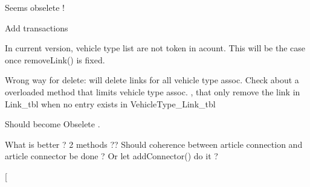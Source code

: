 \begin{DoxyRefList}
\item[\label{todo__todo000093}%
\hypertarget{todo__todo000093}{}%
Class \hyperlink{classmdt_basic_state_machine}{mdt\-Basic\-State\-Machine$<$ S $>$} ]Seems obselete !  
\item[\label{todo__todo000054}%
\hypertarget{todo__todo000054}{}%
Member \hyperlink{classmdt_cl_direct_link_aa7a155c3bf99b91e2d9cff85e93f332b}{mdt\-Cl\-Direct\-Link\-:\-:add\-Links\-By\-Unit\-Connector} (const Q\-Variant unit\-Connector\-Id\-S, const Q\-Variant unit\-Connector\-Id\-E, \hyperlink{classmdt_cl_path_graph}{mdt\-Cl\-Path\-Graph} $\ast$graph)]Add transactions  
\item[\label{todo__todo000056}%
\hypertarget{todo__todo000056}{}%
Member \hyperlink{classmdt_cl_link_ac32bfef9f23b431ea4d3d546e6c21361}{mdt\-Cl\-Link\-:\-:disconnect\-Connectors} (const Q\-Variant \&start\-Unit\-Connector\-Id, const Q\-Variant \&end\-Unit\-Connector\-Id, const Q\-List$<$ Q\-Variant $>$ \&start\-Vehicle\-Type\-Id\-List, const Q\-List$<$ Q\-Variant $>$ \&end\-Vehicle\-Type\-Id\-List)]In current version, vehicle type list are not token in acount. This will be the case once remove\-Link() is fixed.  
\item[\label{todo__todo000055}%
\hypertarget{todo__todo000055}{}%
Member \hyperlink{classmdt_cl_link_a865c0cee1fab1c9209d139dcd70f9fbd}{mdt\-Cl\-Link\-:\-:remove\-Link} (const Q\-Variant \&unit\-Connection\-Start\-Id, const Q\-Variant \&unit\-Connection\-End\-Id, bool handle\-Transaction=true)]Wrong way for delete\-: will delete links for all vehicle type assoc. Check about a overloaded method that limits vehicle type assoc. , that only remove the link in Link\-\_\-tbl when no entry exists in Vehicle\-Type\-\_\-\-Link\-\_\-tbl  
\item[\label{todo__todo000057}%
\hypertarget{todo__todo000057}{}%
Member \hyperlink{classmdt_cl_path_graph_ada63b3baac0bca23e5bd7f9c798a29b2}{mdt\-Cl\-Path\-Graph\-:\-:last\-Error} () const ]Should become Obselete .  
\item[\label{todo__todo000058}%
\hypertarget{todo__todo000058}{}%
Member \hyperlink{classmdt_cl_unit_a9aa3d52f4e6d79fa003d96e04be8223e}{mdt\-Cl\-Unit\-:\-:add\-Connection\-Data\-List\-From\-Article\-Connection\-Id\-List} (\hyperlink{classmdt_cl_unit_connector_data}{mdt\-Cl\-Unit\-Connector\-Data} \&data, const Q\-List$<$ Q\-Variant $>$ \&article\-Connection\-Id\-List, bool copy\-Contact\-Name)]What is better ? 2 methods ?? Should coherence between article connection and article connector be done ? Or let add\-Connector() do it ? 
\item[\label{todo__todo000059}%

\end{DoxyRefList}
